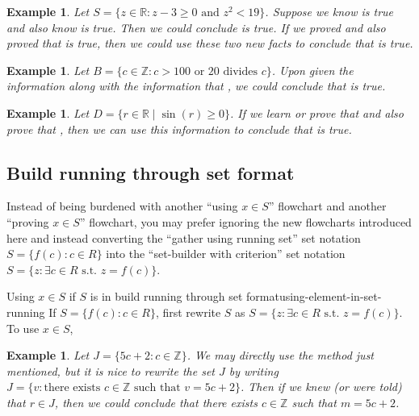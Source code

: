 \documentclass{book}
\newcounter{ekcounter}%
\theoremstyle{ekimcustom}
\newtheorem{example}[ekcounter]{Example}
\begin{document}
\begin{example}
Let $S = \{z \in \mathbb{R} : z-3 \geq 0 \text{ and } z^2 < 19\}$. Suppose we know  is true and also know  is true. Then we could conclude  is true. If we proved  and also proved that  is true, then we could use these two new facts to conclude that  is true.
\end{example}
\begin{example}
Let $B = \{c \in \mathbb{Z} : c > 100 \text{ or } 20 \text{ divides } c\}$. Upon given the information  along with the information that , we could conclude that  is true.
\end{example}
\begin{example}
Let $D = \{r \in \mathbb{R} \mid \sin(r) \geq 0\}$. If we learn or prove that  and also prove that , then we can use this information to conclude that  is true.
\end{example}

\subsection{Build running through set format}

Instead of being burdened with another ``using $x \in S$'' flowchart and another ``proving $x \in S$'' flowchart, you may prefer ignoring the new flowcharts introduced here and instead converting the ``gather using running set'' set notation $S = \{f(c) : c \in R \}$ into the ``set-builder with criterion'' set notation $S = \{z : \exists c \in R \text{ s.t. } z=f(c)\}$.

\begin{bmethod}{Using $x \in S$ if $S$ is in build running through set format}{using-element-in-set-running}
If $S = \{f(c) : c \in R \}$, first rewrite $S$ as $S = \{z : \exists c \in R \text{ s.t. } z=f(c)\}$. To use $x \in S$,
\begin{center}
\end{center}
\end{bmethod}
\begin{example}
Let $J = \{ 5c + 2 : c \in \mathbb{Z}\}$. We may directly use the method just mentioned, but it is nice to rewrite the set $J$ by writing $J = \{ v : \text{there exists } c \in \mathbb{Z} \text{ such that } v=5c+2\}$. Then if we knew (or were told) that $r \in J$, then we could conclude that there exists $c \in \mathbb{Z}$ such that $m=5c+2$.
\end{example}
\end{document}
